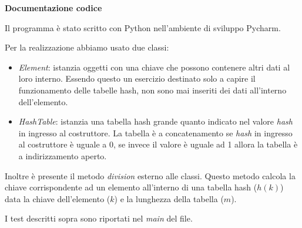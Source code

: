 \documentclass[a4paper, 11pt]{article}
\begin{document}
\vspace{1 cm}
\textbf{Documentazione codice}

\vspace{0,7 cm}
Il programma è stato scritto con Python nell'ambiente di sviluppo Pycharm.

\vspace{0,5 cm}
Per la realizzazione abbiamo usato due classi:
\begin{itemize}
\item \emph{Element}: istanzia oggetti con una chiave che possono contenere altri dati al loro interno. Essendo questo un esercizio destinato solo a capire il funzionamento delle tabelle hash, non sono mai inseriti dei dati all'interno dell'elemento.
\item \emph{HashTable}: istanzia una tabella hash grande quanto indicato nel valore \emph{hash} in ingresso al costruttore. La tabella è a concatenamento se \emph{hash} in ingresso al costruttore è uguale a 0, se invece il valore è uguale ad 1 allora la tabella è a indirizzamento aperto. 
\end{itemize}
Inoltre è presente il metodo \emph{division} esterno alle classi. Questo metodo calcola la chiave corrispondente ad un elemento all'interno di una tabella hash ($h(k)$) data la chiave dell'elemento ($k$) e la lunghezza della tabella ($m$).

\vspace{0,5 cm}
I test descritti sopra sono riportati nel \emph{main} del file.
\end{document}
